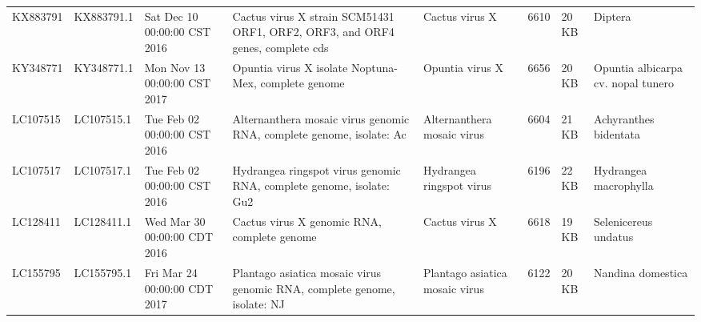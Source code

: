\documentclass[11pt]{article}
\begin{document}
\begin{supptable}[ht]
{\begin{tabular}{@{}llllllll@{}}
KX883791 & KX883791.1 & Sat Dec 10 00:00:00 CST 2016 & Cactus virus X strain SCM51431 ORF1, ORF2, ORF3, and ORF4 genes, complete cds                                                                                                                                                                                    & Cactus virus X                 & 6610            & 20 KB & Diptera                               \\
KY348771 & KY348771.1 & Mon Nov 13 00:00:00 CST 2017 & Opuntia virus X isolate Noptuna-Mex, complete genome                                                                                                                                                                                                             & Opuntia virus X                & 6656            & 20 KB & Opuntia albicarpa cv. nopal tunero    \\
LC107515 & LC107515.1 & Tue Feb 02 00:00:00 CST 2016 & Alternanthera mosaic virus genomic RNA, complete genome, isolate: Ac                                                                                                                                                                                             & Alternanthera mosaic virus     & 6604            & 21 KB & Achyranthes bidentata                 \\
LC107517 & LC107517.1 & Tue Feb 02 00:00:00 CST 2016 & Hydrangea ringspot virus genomic RNA, complete genome, isolate: Gu2                                                                                                                                                                                              & Hydrangea ringspot virus       & 6196            & 22 KB & Hydrangea macrophylla                 \\
LC128411 & LC128411.1 & Wed Mar 30 00:00:00 CDT 2016 & Cactus virus X genomic RNA, complete genome                                                                                                                                                                                                                      & Cactus virus X                 & 6618            & 19 KB & Selenicereus undatus                    \\
LC155795 & LC155795.1 & Fri Mar 24 00:00:00 CDT 2017 & Plantago asiatica mosaic virus genomic RNA, complete genome, isolate: NJ                                                                                                                                                                                         & Plantago asiatica mosaic virus & 6122            & 20 KB & Nandina domestica                     \\

\end{tabular}}
\end{supptable}
\end{document}
